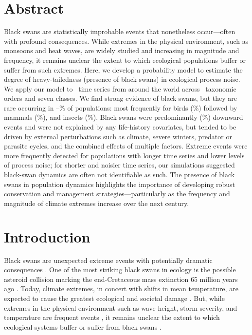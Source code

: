 
\section{Abstract}

Black swans are statistically improbable events that nonetheless occur---often
with profound consequences. While extremes in the physical environment, such
as monsoons and heat waves, are widely studied and increasing in magnitude and
frequency, it remains unclear the extent to which ecological populations
buffer or suffer from such extremes. Here, we develop a probability model to
estimate the degree of heavy-tailedness (presence of black swans) in
ecological process noise. We apply our model to \NPops~time series from around
the world across \NOrders~taxonomic orders and seven classes. We find strong
evidence of black swans, but they are rare occurring in
\overallMinPerc--\overallMaxPerc\% of populations: most frequently for birds
(\AvesRangePerc\%) followed by mammals (\MammaliaRangePerc\%), and insects
(\InsectaRangePerc\%). Black swans were predominantly (\percBSDown \%)
downward events and were not explained by any life-history covariates, but
tended to be driven by external perturbations such as climate, severe winters,
predator or parasite cycles, and the combined effects of multiple factors.
Extreme events were more frequently detected for populations with longer time
series and lower levels of process noise; for shorter and noisier time series,
our simulations suggested black-swan dynamics are often not identifiable as
such. The presence of black swans in population dynamics highlights the
importance of developing robust conservation and management
strategies---particularly as the frequency and magnitude of climate extremes
increase over the next century.


\section{Introduction}

Black swans are unexpected extreme events with potentially dramatic
consequences \citep{taleb2007,sornette2009}. One of the most striking black
swans in ecology is the possible asteroid collision marking the end-Cretaceous
mass extinction 65 million years ago \citep{alvarez1980,harnik2012}. Today,
climate extremes, in concert with shifts in mean temperature, are expected to
cause the greatest ecological and societal damage \citep{ipcc2012}. But, while
extremes in the physical environment such as wave height, storm severity, and
temperature are frequent events \citep{gaines1993,katz2005}, it remains
unclear the extent to which ecological systems buffer or suffer from black
swans \citep{nunez2012}.

